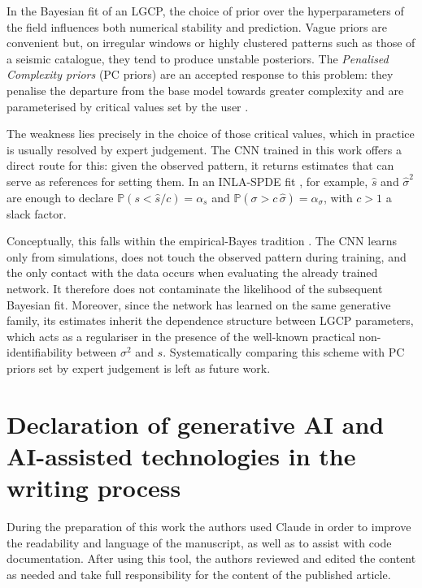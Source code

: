 \documentclass[a4paper,fleqn]{cas-sc}
\numberwithin{equation}{section}
\begin{document}
In the Bayesian fit of an LGCP, the choice of prior over the
hyperparameters of the field influences both numerical stability
and prediction. Vague priors are convenient but, on irregular
windows or highly clustered patterns such as those of a seismic
catalogue, they tend to produce unstable posteriors. The
\emph{Penalised Complexity priors} (PC priors) are an accepted
response to this problem: they penalise the departure from the
base model towards greater complexity and are parameterised by
critical values set by the user
\citep{simpson2017penalising, fuglstad2019constructing}.

The weakness lies precisely in the choice of those critical values,
which in practice is usually resolved by expert judgement. The CNN
trained in this work offers a direct route for this: given the
observed pattern, it returns estimates that can serve as references
for setting them. In an INLA-SPDE fit \citep{Rue2009,toolboxINLA},
for example, $\hat{s}$ and $\hat{\sigma}^2$ are enough to declare
$\mathbb{P}(s<\hat{s}/c)=\alpha_s$ and
$\mathbb{P}(\sigma>c\,\hat{\sigma})=\alpha_\sigma$, with $c>1$ a
slack factor.

Conceptually, this falls within the empirical-Bayes tradition
\citep{CasellaEmpBayes}. The CNN learns only from simulations, does
not touch the observed pattern during training, and the only
contact with the data occurs when evaluating the already trained
network. It therefore does not contaminate the likelihood of the
subsequent Bayesian fit. Moreover, since the network has learned
on the same generative family, its estimates inherit the dependence
structure between LGCP parameters, which acts as a regulariser in
the presence of the well-known practical non-identifiability
between $\sigma^2$ and $s$. Systematically comparing this scheme
with PC priors set by expert judgement is left as future work.

\section*{Declaration of generative AI and AI-assisted technologies in the
writing process}

During the preparation of this work the authors used Claude
\citep{Anthropic2025} in order to improve the readability and language of the manuscript, as
well as to assist with code documentation. After using
this tool, the authors reviewed and edited the content as needed and take
full responsibility for the content of the published article.
\end{document}
